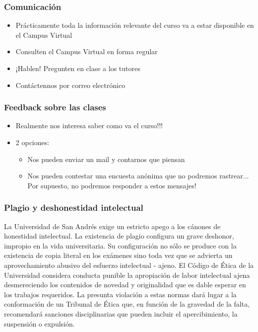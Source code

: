 \documentclass{beamer}
\begin{document}
\begin{frame}
\frametitle{Comunicación}
\begin{itemize}
    \item Prácticamente toda la información relevante del curso va a estar disponible en el Campus Virtual
    \item Consulten el Campus Virtual en forma regular
    \item ¡Hablen! Pregunten en clase a los tutores
    \item Contáctennos por correo electrónico 
\end{itemize}
\end{frame}

\begin{frame}
\frametitle{Feedback sobre las clases}
\begin{itemize}
    \item Realmente nos interesa saber como va el curso!!! \vspace{2mm}
    \item 2 opciones: \vspace{2mm}
        \begin{itemize}
            \item Nos pueden enviar un mail y contarnos que piensan 
            \item Nos pueden contestar una encuesta anónima que no podremos rastrear... Por supuesto, no podremos responder a estos mensajes!
  
        \end{itemize}
\end{itemize}
\end{frame}

\begin{frame}
\frametitle{Plagio y deshonestidad intelectual}
\small{
    La Universidad de San Andrés exige un estricto apego a los cánones de honestidad intelectual. La existencia de plagio configura un grave deshonor, impropio en la vida universitaria. Su configuración no sólo se produce con la existencia de copia literal en los exámenes sino toda vez que se advierta un aprovechamiento abusivo del esfuerzo intelectual  - ajeno. El Código de Ética de la Universidad considera conducta punible la apropiación de labor intelectual ajena desmereciendo los contenidos de novedad y originalidad que es dable esperar en los trabajos requeridos. La presunta violación a estas normas dará lugar a la conformación de un Tribunal de Ética que, en función de la gravedad de la falta, recomendará sanciones disciplinarias que pueden incluir el apercibimiento, la suspensión o expulsión.}
\end{frame}
\end{document}
